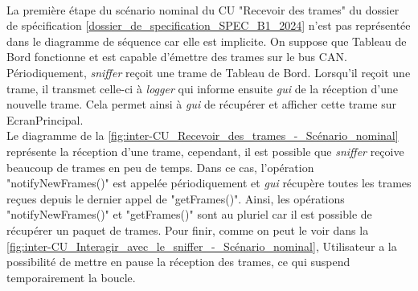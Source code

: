 \\
La première étape du scénario nominal du CU "Recevoir des trames" du dossier de spécification [\hyperref[SPEC]{dossier\_de\_specification\_SPEC\_B1\_2024}] n'est pas représentée dans le diagramme de séquence car elle est implicite. On suppose que Tableau de Bord fonctionne et est capable d'émettre des trames sur le bus CAN. \\
Périodiquement, \textit{sniffer} reçoit une trame de Tableau de Bord. Lorsqu'il reçoit une trame, il transmet celle-ci à \textit{logger} qui informe ensuite \textit{gui} de la réception d'une nouvelle trame. Cela permet ainsi à \textit{gui} de récupérer et afficher cette trame sur EcranPrincipal. \\

Le diagramme de la \autoref{fig:inter-CU_Recevoir_des_trames_-_Scénario_nominal} représente la réception d'une trame, cependant, il est possible que \textit{sniffer} reçoive beaucoup de trames en peu de temps. Dans ce cas, l'opération "notifyNewFrames()" est appelée périodiquement et \textit{gui} récupère toutes les trames reçues depuis le dernier appel de "getFrames()". Ainsi, les opérations "notifyNewFrames()" et "getFrames()" sont au pluriel car il est possible de récupérer un paquet de trames. 
Pour finir, comme on peut le voir dans la \autoref{fig:inter-CU_Interagir_avec_le_sniffer_-_Scénario_nominal}, Utilisateur a la possibilité de mettre en pause la réception des trames, ce qui suspend temporairement la boucle. \\